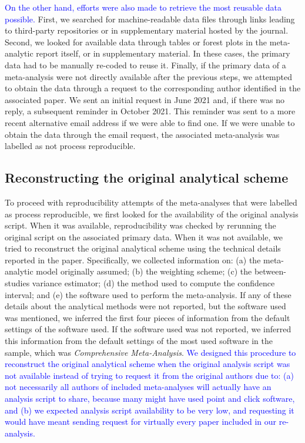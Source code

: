 \documentclass[
  ,man,floatsintext]{apa6}
\begin{document}
\textcolor{blue}{On the other hand, efforts were also made to retrieve the most reusable data possible.} First, we searched for machine-readable data files through links leading to third-party repositories or in supplementary material hosted by the journal. Second, we looked for available data through tables or forest plots in the meta-analytic report itself, or in supplementary material. In these cases, the primary data had to be manually re-coded to reuse it. Finally, if the primary data of a meta-analysis were not directly available after the previous steps, we attempted to obtain the data through a request to the corresponding author identified in the associated paper. We sent an initial request in June 2021 and, if there was no reply, a subsequent reminder in October 2021. This reminder was sent to a more recent alternative email address if we were able to find one. If we were unable to obtain the data through the email request, the associated meta-analysis was labelled as not process reproducible.

\hypertarget{reconstructing-the-original-analytical-scheme}{%
\subsection{Reconstructing the original analytical scheme}\label{reconstructing-the-original-analytical-scheme}}

To proceed with reproducibility attempts of the meta-analyses that were labelled as process reproducible, we first looked for the availability of the original analysis script. When it was available, reproducibility was checked by rerunning the original script on the associated primary data. When it was not available, we tried to reconstruct the original analytical scheme using the technical details reported in the paper. Specifically, we collected information on: (a) the meta-analytic model originally assumed; (b) the weighting scheme; (c) the between-studies variance estimator; (d) the method used to compute the confidence interval; and (e) the software used to perform the meta-analysis. If any of these details about the analytical methods were not reported, but the software used was mentioned, we inferred the first four pieces of information from the default settings of the software used. If the software used was not reported, we inferred this information from the default settings of the most used software in the sample, which was \emph{Comprehensive Meta-Analysis}. \textcolor{blue}{We designed this procedure to reconstruct the original analytical scheme when the original analysis script was not available instead of trying to request it from the original authors due to: (a) not necessarily all authors of included meta-analyses will actually have an analysis script to share, because many might have used point and click software, and (b) we expected analysis script availability to be very low, and requesting it would have meant sending request for virtually every paper included in our re-analysis.}
\end{document}

